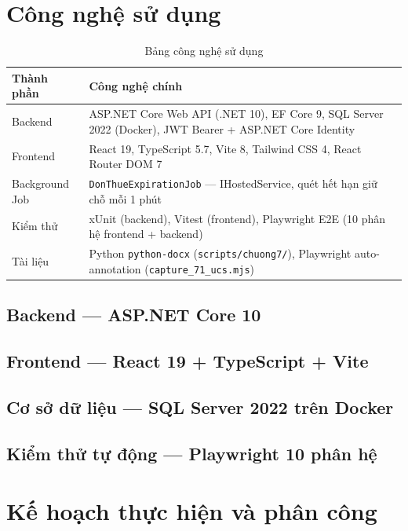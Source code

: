 \section{Công nghệ sử dụng}
\label{sec:cong_nghe}

\begin{table}[H]
\centering
\caption{Bảng công nghệ sử dụng}
\label{tab:cong_nghe}
\begin{tabularx}{\textwidth}{|l|X|}
\hline
\textbf{Thành phần} & \textbf{Công nghệ chính} \\ \hline
Backend  & ASP.NET Core Web API (.NET 10), EF Core 9, SQL Server 2022 (Docker), JWT Bearer + ASP.NET Core Identity \\ \hline
Frontend & React 19, TypeScript 5.7, Vite 8, Tailwind CSS 4, React Router DOM 7 \\ \hline
Background Job & \texttt{DonThueExpirationJob} --- IHostedService, quét hết hạn giữ chỗ mỗi 1 phút \\ \hline
Kiểm thử & xUnit (backend), Vitest (frontend), Playwright E2E (10 phân hệ frontend + backend) \\ \hline
Tài liệu & Python \texttt{python-docx} (\texttt{scripts/chuong7/}), Playwright auto-annotation (\texttt{capture\_71\_ucs.mjs}) \\ \hline
\end{tabularx}
\end{table}

\subsection{Backend --- ASP.NET Core 10}

\subsection{Frontend --- React 19 + TypeScript + Vite}

\subsection{Cơ sở dữ liệu --- SQL Server 2022 trên Docker}

\subsection{Kiểm thử tự động --- Playwright 10 phân hệ}

\section{Kế hoạch thực hiện và phân công}
\label{sec:phan_cong}

